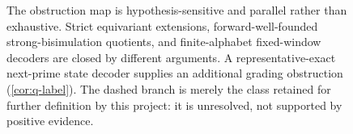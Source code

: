 \begin{figure}[t]
  \caption{The obstruction map is hypothesis-sensitive and parallel rather
  than exhaustive.  Strict equivariant extensions, forward-well-founded
  strong-bisimulation quotients, and finite-alphabet fixed-window decoders
  are closed by different arguments.  A representative-exact next-prime
  state decoder supplies an additional grading obstruction
  (\cref{cor:q-label}).  The dashed branch is merely the class retained for
  further definition by this project: it is unresolved, not supported by
  positive evidence.}
  \label{fig:obstruction-map}
\end{figure}
